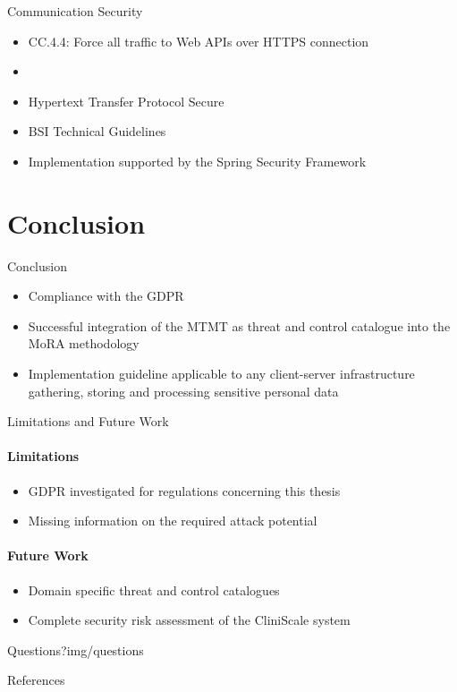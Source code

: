 \documentclass[xcolor=table]{beamer}
\begin{document}
\begin{frame}{Communication Security}
\begin{itemize}[label={}]
    \item CC.4.4: Force all traffic to Web APIs over HTTPS connection
    \item
\end{itemize}
\begin{itemize}
    \item Hypertext Transfer Protocol Secure
    \item BSI Technical Guidelines \cite{bsitr02}
    \item Implementation supported by the Spring Security Framework
\end{itemize}
\end{frame}

\section{Conclusion}
\begin{frame}{Conclusion}
\begin{itemize}
    \item Compliance with the GDPR
    \item Successful integration of the MTMT as threat and control catalogue into the MoRA methodology
    \item Implementation guideline applicable to any client-server infrastructure gathering, storing and processing sensitive personal data
\end{itemize}
\end{frame}


\begin{frame}{Limitations and Future Work}
\paragraph{\textbf{Limitations}}
\begin{itemize}
    \item GDPR investigated for regulations concerning this thesis
    \item Missing information on the required attack potential\\
\end{itemize}
\paragraph{\textbf{Future Work}}
\begin{itemize}
    \item Domain specific threat and control catalogues
    \item Complete security risk assessment of the CliniScale system
\end{itemize}
\end{frame}

\begin{frameWithPicture}{Questions?}{img/questions}
\end{frameWithPicture}%

\begin{frame}[allowframebreaks]{References}
\nocite{*}
\printbibliography
\end{frame}
\end{document}
